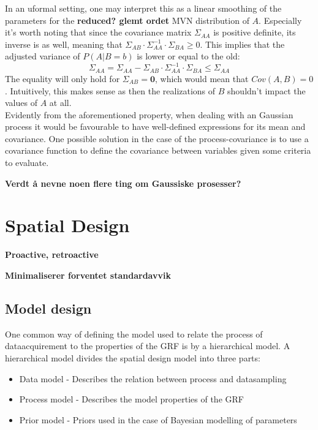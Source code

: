 \documentclass{report}
\begin{document}
In an uformal setting, one may interpret this as a linear smoothing of the parameters for the \textbf{reduced? glemt ordet} MVN distribution of $A$. Especially it's worth noting that since the covariance matrix $\Sigma_{AA}$ is positive definite, its inverse is as well, meaning that $\Sigma_{AB} \cdot \Sigma_{AA}^{-1} \cdot \Sigma_{BA} \geq 0$. This implies that the adjusted variance of $P(A | B = b)$ is lower or equal to the old: 
\begin{equation}
\Sigma_{AA} = \Sigma_{AA} - \Sigma_{AB} \cdot \Sigma_{AA}^{-1} \cdot \Sigma_{BA} \leq \Sigma_{AA}
\end{equation}
The equality will only hold for $\Sigma_{AB} = \mathbf{0}$, which would mean that $Cov(A, B) = 0$. Intuitively, this makes sense as then the realizations of $B$ shouldn't impact the values of $A$ at all. \\

Evidently from the aforementioned property, when dealing with an Gaussian process it would be favourable to have well-defined expressions for its mean and covariance. One possible solution in the case of the process-covariance is to use a covariance function to define the covariance between variables given some criteria to evaluate.

\textbf{Verdt å nevne noen flere ting om Gaussiske prosesser?}


\chapter{Spatial Design}
\textbf{Proactive, retroactive} 

\textbf{Minimaliserer forventet standardavvik} 

\section{Model design} \label{model:hm}
One common way of defining the model used to relate the process of dataacquirement to the properties of the GRF is by a hierarchical model. A hierarchical model divides the spatial design model 
into three parts: 
\begin{itemize}
\item Data model - Describes the relation between process and datasampling
\item Process model - Describes the model properties of the GRF 
\item Prior model - Priors used in the case of Bayesian modelling of parameters
\end{itemize}
\end{document}
